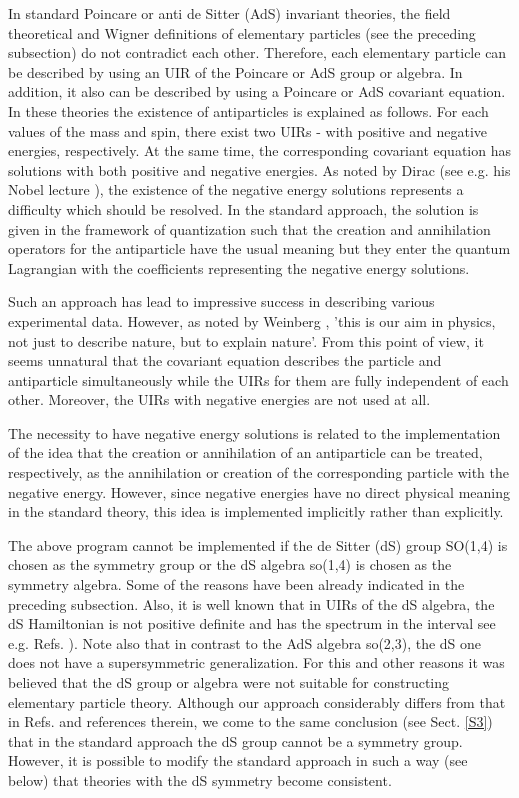 \documentclass[a4paper,12pt]{article}%
\begin{document}
In standard Poincare or anti de Sitter (AdS) invariant
theories, the field theoretical and Wigner definitions
of elementary particles (see the preceding subsection)
do not contradict each other. Therefore, each elementary
particle can be described by using an UIR of the Poincare 
or AdS group or algebra. In addition, it also can be described 
by using a Poincare or AdS covariant 
equation. In these theories the existence of antiparticles
is explained as follows. For each values of the mass 
and spin, there exist two UIRs - with positive and 
negative energies, respectively.
At the same time, the corresponding covariant equation 
has solutions with both positive and negative energies.    
As noted by Dirac (see e.g. his Nobel
lecture \cite{DirNobel}), the existence of the negative
energy solutions represents a difficulty which should be
resolved. In the standard approach, the solution is given
in the framework of quantization such that the
creation and annihilation operators for the antiparticle
have the usual meaning but they enter the quantum Lagrangian 
with the coefficients representing the negative energy
solutions. 

Such an approach has lead to impressive success in 
describing various experimental data. However, as noted by
Weinberg \cite{Wein1}, 'this is our aim in physics, not
just to describe nature, but to explain nature'. From this 
point of view, it seems unnatural that the covariant
equation describes the particle and antiparticle
simultaneously while the UIRs for them are fully 
independent of each other. Moreover, the UIRs with
negative energies are not used at all. 

The necessity to have negative energy solutions is
related to the implementation of the idea that the
creation or annihilation of an antiparticle can be treated,
respectively, as the annihilation or creation of the 
corresponding particle with the negative energy. However,
since negative energies have no direct physical meaning in
the standard theory, this idea is implemented implicitly
rather than explicitly. 

The above program cannot be implemented if
the de Sitter (dS) group SO(1,4) is chosen as the 
symmetry group or the dS algebra so(1,4) is chosen as
the symmetry algebra. Some of the reasons have been already
indicated in the preceding subsection. Also, it is 
well known that in UIRs of the dS 
algebra, the dS Hamiltonian is not positive definite and
has the spectrum in the interval \myHighlight{$(-\infty,+\infty)$}\coordHE{} 
see e.g. Refs. \cite{Dobrev,Men,Moy,lev1,lev1a}). 
Note also that in contrast to the AdS
algebra so(2,3), the dS one does not have a supersymmetric
generalization. For this and other reasons it was believed 
that the dS group or algebra were not suitable for constructing 
elementary particle theory. Although our approach
considerably differs from that in Refs. \cite{Narlikar,Susskind}
and references therein, we come to the same conclusion
(see Sect. \ref{S3}) that in the standard approach the dS 
group cannot be a symmetry group. However, it is possible to 
modify the standard approach in such a way (see below) that 
theories with the dS symmetry become consistent.
\end{document}
